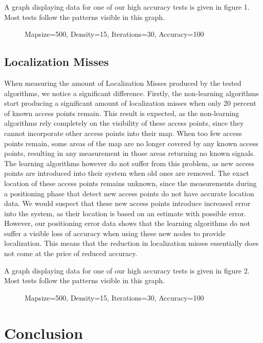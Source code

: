\documentclass{sig-alternate-br}
\begin{document}
A graph displaying data for one of our high accuracy tests is given in figure 1. Most tests follow the patterns visible in this graph.

\begin{figure}
\centering 
{} 
\caption{Mapsize=500, Density=15, Iterations=30, Accuracy=100}
\label{fig:abc} %
\end{figure}


\subsection{Localization Misses}
When measuring the amount of Localization Misses produced by the tested algorithms, we notice a significant difference. Firstly, the non-learning algorithms start producing a significant amount of localization misses when only 20 percent of known access points remain. This result is expected, as the non-learning algorithms rely completely on the visibility of these access points, since they cannot incorporate other access points into their map. When too few access points remain, some areas of the map are no longer covered by any known access points, resulting in any measurement in those areas returning no known signals. The learning algorithms however do not suffer from this problem, as new access points are introduced into their system when old ones are removed. The exact location of these access points remains unknown, since the measurements during a positioning phase that detect new access points do not have accurate location data. We would suspect that these new access points introduce increased error into the system, as their location is based on an estimate with possible error. However, our positioning error data shows that the learning algorithms do not suffer a visible loss of accuracy when using these new nodes to provide localization. This means that the reduction in localization misses essentially does not come at the price of reduced accuracy.

A graph displaying data for one of our high accuracy tests is given in figure 2. Most tests follow the patterns visible in this graph.


\begin{figure}
\centering 
{} 
\caption{Mapsize=500, Density=15, Iterations=30, Accuracy=100}
\label{fig:abc} %
\end{figure}

\section{Conclusion}
\end{document}
